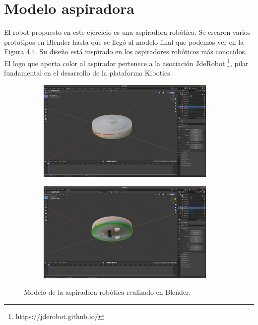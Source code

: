 \section{Modelo aspiradora}

El robot  propuesto en este ejercicio es una aspiradora robótica. Se crearon varios prototipos en Blender  hasta que se llegó al modelo final que podemos ver en la Figura 4.4. Su diseño está inspirado en los aspiradores robóticos más conocidos. El logo que aporta color al aspirador pertenece a la asociación JdeRobot \footnote{https://jderobot.github.io/}, pilar fundamental en el desarrollo de la plataforma Kibotics.
 
 \begin{figure}[H]
  \begin{subfigure}[b]{0.5\textwidth}
  \centering
    \includegraphics[width=0.95\textwidth, height=0.7\textwidth]{chapters/images/roombablender.png}
    \caption{}
    \label{fig:f1}
  \end{subfigure}
  \hfill
  \begin{subfigure}[b]{0.5\textwidth}
  \centering
    \includegraphics[width=0.95\textwidth, height=0.7\textwidth]{chapters/images/roombablender2.png}
	\caption{}    
    \label{fig:f2}
 
  \end{subfigure}
  \caption{Modelo de la aspiradora robótica  realizado en Blender.}
\end{figure}

